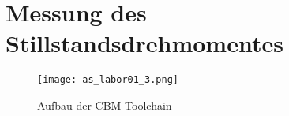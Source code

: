 \section{Messung des Stillstandsdrehmomentes}

\begin{figure}[htp]
 \centering
 \texttt{[image: as\_labor01\_3.png]}
 \caption{Aufbau der CBM-Toolchain}
 \label{fig:Plot Aufgabe 3}
\end{figure}


